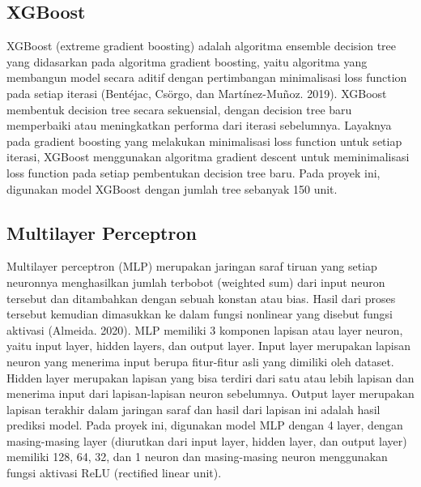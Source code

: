 \subsection{XGBoost}
XGBoost (extreme gradient boosting) adalah algoritma ensemble decision tree yang didasarkan pada algoritma gradient boosting, yaitu algoritma yang membangun model secara aditif dengan pertimbangan minimalisasi loss function pada setiap iterasi (Bentéjac, Csörgo, dan Martínez-Muñoz. 2019). XGBoost membentuk decision tree secara sekuensial, dengan decision tree baru memperbaiki atau meningkatkan performa dari iterasi sebelumnya. Layaknya pada gradient boosting yang melakukan minimalisasi loss function untuk setiap iterasi, XGBoost menggunakan algoritma gradient descent untuk meminimalisasi loss function pada setiap pembentukan decision tree baru. Pada proyek ini, digunakan model XGBoost dengan jumlah tree sebanyak 150 unit.

\subsection{Multilayer Perceptron}
Multilayer perceptron (MLP) merupakan jaringan saraf tiruan yang setiap neuronnya menghasilkan jumlah terbobot (weighted sum) dari input neuron tersebut dan ditambahkan dengan sebuah konstan atau bias. Hasil dari proses tersebut kemudian dimasukkan ke dalam fungsi nonlinear yang disebut fungsi aktivasi (Almeida. 2020). MLP memiliki 3 komponen lapisan atau layer neuron, yaitu input layer, hidden layers, dan output layer. Input layer merupakan lapisan neuron yang menerima input berupa fitur-fitur asli yang dimiliki oleh dataset. Hidden layer merupakan lapisan yang bisa terdiri dari satu atau lebih lapisan dan menerima input dari lapisan-lapisan neuron sebelumnya. Output layer merupakan lapisan terakhir dalam jaringan saraf dan hasil dari lapisan ini adalah hasil prediksi model. Pada proyek ini, digunakan model MLP dengan 4 layer, dengan masing-masing layer (diurutkan dari input layer, hidden layer, dan output layer) memiliki 128, 64, 32, dan 1 neuron dan masing-masing neuron menggunakan fungsi aktivasi ReLU (rectified linear unit).

